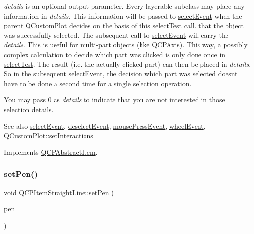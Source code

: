 {\itshape details} is an optional output parameter. Every layerable subclass may place any information in {\itshape details}. This information will be passed to \hyperlink{class_q_c_p_abstract_item_aa4b969c58797f39c9c0b6c07c7869d17}{select\+Event} when the parent \hyperlink{class_q_custom_plot}{Q\+Custom\+Plot} decides on the basis of this select\+Test call, that the object was successfully selected. The subsequent call to \hyperlink{class_q_c_p_abstract_item_aa4b969c58797f39c9c0b6c07c7869d17}{select\+Event} will carry the {\itshape details}. This is useful for multi-\/part objects (like \hyperlink{class_q_c_p_axis}{Q\+C\+P\+Axis}). This way, a possibly complex calculation to decide which part was clicked is only done once in \hyperlink{class_q_c_p_item_straight_line_a2e36c9d4dcc3aeda78a5584f790e39e3}{select\+Test}. The result (i.\+e. the actually clicked part) can then be placed in {\itshape details}. So in the subsequent \hyperlink{class_q_c_p_abstract_item_aa4b969c58797f39c9c0b6c07c7869d17}{select\+Event}, the decision which part was selected doesn\textquotesingle{}t have to be done a second time for a single selection operation.

You may pass 0 as {\itshape details} to indicate that you are not interested in those selection details.

\begin{DoxySeeAlso}{See also}
\hyperlink{class_q_c_p_abstract_item_aa4b969c58797f39c9c0b6c07c7869d17}{select\+Event}, \hyperlink{class_q_c_p_abstract_item_af9093798cb07a861dcc73f93ca16c0c1}{deselect\+Event}, \hyperlink{class_q_c_p_layerable_af6567604818db90f4fd52822f8bc8376}{mouse\+Press\+Event}, \hyperlink{class_q_c_p_layerable_a47dfd7b8fd99c08ca54e09c362b6f022}{wheel\+Event}, \hyperlink{class_q_custom_plot_a5ee1e2f6ae27419deca53e75907c27e5}{Q\+Custom\+Plot\+::set\+Interactions} 
\end{DoxySeeAlso}


Implements \hyperlink{class_q_c_p_abstract_item_ae41d0349d68bb802c49104afd100ba2a}{Q\+C\+P\+Abstract\+Item}.

\mbox{\label{class_q_c_p_item_straight_line_a9f36c9c9e60d7d9ac084c80380ac8601}} 
\subsubsection{\texorpdfstring{set\+Pen()}{setPen()}}
{\footnotesize\ttfamily void Q\+C\+P\+Item\+Straight\+Line\+::set\+Pen (\begin{DoxyParamCaption}\item[{const Q\+Pen \&}]{pen }\end{DoxyParamCaption})}

